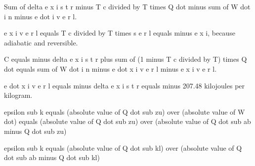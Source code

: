 Sum of delta e x i s t r minus T c divided by T times Q dot minus sum of W dot i n minus e dot i v e r l.

e x i v e r l equals T c divided by T times s e r l equals minus e x i, because adiabatic and reversible.

C equals minus delta e x i s t r plus sum of (1 minus T c divided by T) times Q dot equals sum of W dot i n minus e dot x i v e r l minus e x i v e r l.

e dot x i v e r l equals minus delta e x i s t r equals minus 207.48 kilojoules per kilogram.

epsilon sub k equals (absolute value of Q dot sub zu) over (absolute value of W dot) equals (absolute value of Q dot sub zu) over (absolute value of Q dot sub ab minus Q dot sub zu)

epsilon sub k equals (absolute value of Q dot sub kl) over (absolute value of Q dot sub ab minus Q dot sub kl)